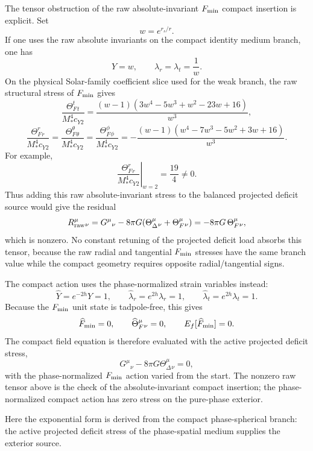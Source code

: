 \documentclass[12pt,a4paper]{article}
\begin{document}
The tensor obstruction of the raw absolute-invariant $F_{\rm min}$ compact
insertion is explicit. Set
\[
w=e^{r_s/r}.
\]
If one uses the raw absolute invariants on the compact identity medium branch,
one has
\[
Y=w,\qquad \lambda_r=\lambda_t=\frac{1}{w}.
\]
On the physical Solar-family coefficient slice used for the weak branch, the
raw structural stress of $F_{\rm min}$ gives
\[
\frac{\Theta_F^t{}_t}{M_*^4c_{Y2}}
=\frac{(w-1)(3w^4-5w^3+w^2-23w+16)}{w^3},
\]
\[
\frac{\Theta_F^r{}_r}{M_*^4c_{Y2}}
=\frac{\Theta_F^\theta{}_\theta}{M_*^4c_{Y2}}
=\frac{\Theta_F^\phi{}_\phi}{M_*^4c_{Y2}}
=-\frac{(w-1)(w^4-7w^3-5w^2+3w+16)}{w^3}.
\]
For example,
\[
\left.\frac{\Theta_F^r{}_r}{M_*^4c_{Y2}}\right|_{w=2}=\frac{19}{4}\neq0.
\]
Thus adding this raw absolute-invariant stress to the balanced projected
deficit source would give the residual
\[
R_{\rm raw}^\mu{}_\nu
=G^\mu{}_\nu-8\pi G(\Theta_\Delta^\mu{}_\nu+\Theta_F^\mu{}_\nu)
=-8\pi G\,\Theta_F^\mu{}_\nu,
\]
which is nonzero. No constant retuning of the projected deficit load absorbs
this tensor, because the raw radial and tangential $F_{\rm min}$ stresses have
the same branch value while the compact geometry requires opposite
radial/tangential signs.

The compact action uses the phase-normalized strain variables instead:
\[
\widehat Y=e^{-2h}Y=1,\qquad
\widehat\lambda_r=e^{2h}\lambda_r=1,\qquad
\widehat\lambda_t=e^{2h}\lambda_t=1.
\]
Because the $F_{\rm min}$ unit state is tadpole-free, this gives
\[
\widehat F_{\rm min}=0,\qquad
\widehat\Theta_F^\mu{}_\nu=0,\qquad
E_f[\widehat F_{\rm min}]=0.
\]
The compact field equation is therefore evaluated with the active projected
deficit stress,
\[
G^\mu{}_\nu-8\pi G\Theta_\Delta^\mu{}_\nu=0,
\]
with the phase-normalized $F_{\rm min}$ action varied from the start. The
nonzero raw tensor above is the check of the absolute-invariant compact
insertion; the phase-normalized compact action has zero stress on the pure-phase
exterior.

Here the exponential form is derived from the compact phase-spherical branch:
the active projected deficit stress of the phase-spatial medium supplies the
exterior source.
\end{document}
